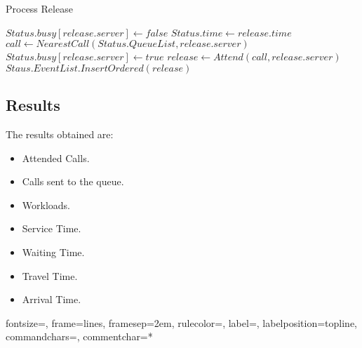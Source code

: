 \begin{frame}
  \begin{algorithm}
    \hline \vspace{3pt}
    \caption{Process Release}\label{proc_rel}
    \vspace{3pt} \hline
    \begin{algorithmic}[0]
      \State $Status.busy[release.server] \gets false$
      \State $Status.time \gets release.time$
      \State $call \gets NearestCall(Status.QueueList,release.server)$
      \State $Status.busy[release.server] \gets true$
      \State $release \gets Attend(call,release.server)$
      \State $Staus.EventList.InsertOrdered(release)$
      \EndIf
      \EndProcedure
      \hline
    \end{algorithmic}
  \end{algorithm}
\end{frame}

\subsection{Results}
\begin{frame}
  The results obtained are:
  \begin{itemize}
  \item Attended Calls.
  \item Calls sent to the queue.
  \item Workloads.
  \item Service Time.
  \item Waiting Time.
  \item Travel Time.
  \item Arrival Time.
  \end{itemize}
\end{frame}

{}%
{fontsize=\footnotesize,
 frame=lines,  %
 framesep=2em, %
 rulecolor=\color{Gray},
 label=,
 labelposition=topline,
 commandchars=\|\(\), %
 commentchar=*        %
}

\begin{frame}
\end{frame}

